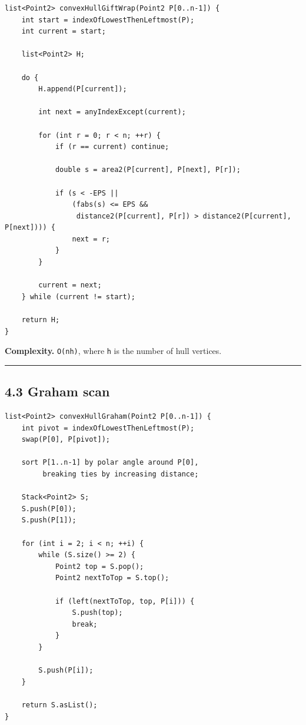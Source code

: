 \documentclass[11pt]{article}
\begin{document}
\begin{verbatim}
list<Point2> convexHullGiftWrap(Point2 P[0..n-1]) {
    int start = indexOfLowestThenLeftmost(P);
    int current = start;

    list<Point2> H;

    do {
        H.append(P[current]);

        int next = anyIndexExcept(current);

        for (int r = 0; r < n; ++r) {
            if (r == current) continue;

            double s = area2(P[current], P[next], P[r]);

            if (s < -EPS ||
                (fabs(s) <= EPS &&
                 distance2(P[current], P[r]) > distance2(P[current], P[next]))) {
                next = r;
            }
        }

        current = next;
    } while (current != start);

    return H;
}
\end{verbatim}

\textbf{Complexity.} \texttt{O(nh)}, where
\texttt{h} is the number of hull vertices.

\begin{center}\rule{0.5\linewidth}{0.5pt}\end{center}

\subsection{4.3 Graham scan}\label{graham-scan}

\begin{verbatim}
list<Point2> convexHullGraham(Point2 P[0..n-1]) {
    int pivot = indexOfLowestThenLeftmost(P);
    swap(P[0], P[pivot]);

    sort P[1..n-1] by polar angle around P[0],
         breaking ties by increasing distance;

    Stack<Point2> S;
    S.push(P[0]);
    S.push(P[1]);

    for (int i = 2; i < n; ++i) {
        while (S.size() >= 2) {
            Point2 top = S.pop();
            Point2 nextToTop = S.top();

            if (left(nextToTop, top, P[i])) {
                S.push(top);
                break;
            }
        }

        S.push(P[i]);
    }

    return S.asList();
}
\end{verbatim}
\end{document}
